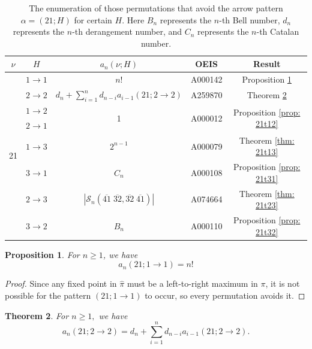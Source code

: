 \documentclass[11pt]{article}
\newcommand{\ol}[1]{\overline{#1}}
\renewcommand\S{\mathcal S}
\newtheorem{theorem}{Theorem}[section]
\newtheorem{proposition}[theorem]{Proposition}
\theoremstyle{definition}
\begin{document}
\renewcommand{\arraystretch}{1.2}
\begin{table}[H]
    \centering
    \begin{tabular}{|c|c|c|c|c|} 
    \hline
         $\nu$ & $H$ & $a_n(\nu;H)$  & OEIS & Result \\ \hline\hline
        \multirow{9}{*}{21}  & $1\to1$ 
        & $n!$& A000142 & Proposition \ref{prop: 21t11} \\ \cline{2-5}
           & $2\to2$ 
        & $d_n+\sum_{i=1}^{n} d_{n-i}a_{i-1}(21;2\to 2)$& A259870 & Theorem \ref{thm: 21t22} \\ \cline{2-5}  & $1\to2$ 
        &  \multirow{2}{*}{1}  & \multirow{2}{*}{A000012}& \multirow{2}{*}{Proposition \ref{prop: 21t12}} \\
           & $2\to1$ 
        & & & \\ \cline{2-5}
           & $1\to3$ 
        & $2^{n-1}$ & A000079 & Theorem \ref{thm: 21t13} \\ \cline{2-5}
           & $3\to1$ 
        &  $C_n$ &  A000108 & {Proposition} \ref{prop: 21t31} \\ \cline{2-5}
           & $2\to3$ 
        &$|\S_n(\ol{41}\; \ol{32}, \ol{32} \; \ol{41})|$ & A074664 & Theorem \ref{thm: 21t23} \\ \cline{2-5}
           & $3\to2$ 
        & $B_n$ & A000110 & Proposition \ref{prop: 21t32} \\ 
            \hline
        
    \end{tabular}
    \caption{The enumeration of those permutations that avoid the arrow pattern $\alpha=(21;H)$ for certain $H$. Here $B_n$ represents the $n$-th Bell number, $d_n$ represents the $n$-th derangement number, and $C_n$ represents the $n$-th Catalan number.}
    \label{tab:21}
\end{table}

\begin{proposition} \label{prop: 21t11}
    For $n \geq 1$, we have
    \[
    a_n(21;1 \to 1) = n!
    \]
\end{proposition}

\begin{proof}
    Since any fixed point in $\hat\pi$ must be a left-to-right maximum in $\pi$, it is not possible for the pattern $(21; 1 \to1)$ to occur, so every permutation avoids it.
\end{proof}

\begin{theorem} \label{thm: 21t22}
    For $n\geq 1,$ we have \[a_n(21;2\to 2) = d_n+\sum_{i=1}^{n} d_{n-i}a_{i-1}(21;2\to 2).\]
\end{theorem}
\end{document}
